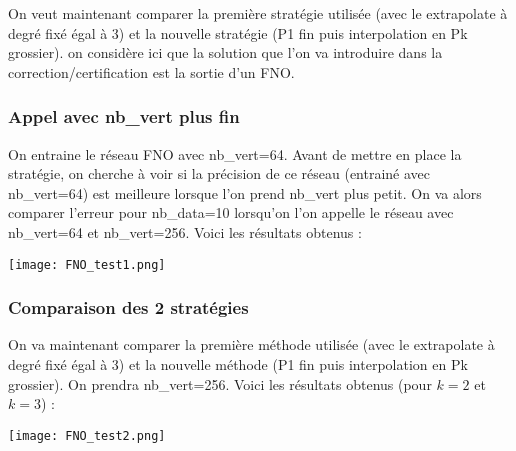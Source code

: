 On veut maintenant comparer la première stratégie utilisée (avec le extrapolate à degré fixé égal à 3) et la nouvelle stratégie (P1 fin puis interpolation en Pk grossier). on considère ici que la solution que l'on va introduire dans la correction/certification est la sortie d'un FNO.

\subsubsection*{Appel avec nb\_vert plus fin}

On entraine le réseau FNO avec nb\_vert=64. Avant de mettre en place la stratégie, on cherche à voir si la précision de ce réseau (entrainé avec nb\_vert=64) est meilleure lorsque l'on prend nb\_vert plus petit. On va alors comparer l'erreur pour nb\_data=10 lorsqu'on l'on appelle le réseau avec nb\_vert=64 et nb\_vert=256. Voici les résultats obtenus :

\begin{minipage}{\linewidth}
	\centering
	\texttt{[image: FNO\_test1.png]}
\end{minipage}

\subsubsection*{Comparaison des 2 stratégies}

On va maintenant comparer la première méthode utilisée (avec le extrapolate à degré fixé égal à 3) et la nouvelle méthode (P1 fin puis interpolation en Pk grossier). On prendra nb\_vert=256. Voici les résultats obtenus (pour $k=2$ et $k=3$) :

\begin{minipage}{\linewidth}
	\centering
	\texttt{[image: FNO\_test2.png]}
\end{minipage}

